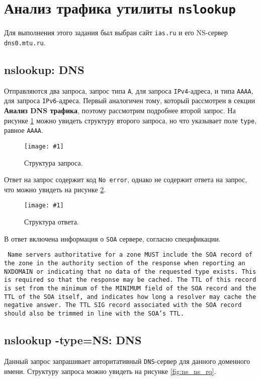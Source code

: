 \documentclass[12pt, a4paper]{article}
\newcommand{\figc}[4]{
  \begin{figure}[H]
  \begin{center}
    \texttt{[image: \#1]}
    \caption{#2}
    \label{fig:#3}
  \end{center}
  \end{figure}
}
\begin{document}
\section{Анализ трафика утилиты \texttt{nslookup}}

Для выполнения этого задания был выбран сайт \texttt{ias.ru} и его NS-сервер
\texttt{dns0.mtu.ru}.

\subsection{nslookup: DNS}

Отправляются два запроса, запрос типа \texttt{A}, для запроса \texttt{IPv4}-адреса,
и типа \texttt{AAAA}, для запроса \texttt{IPv6}-адреса. Первый аналогичен тому,
который рассмотрен в секции \textbf{Анализ DNS трафика}, поэтому рассмотрим
подробнее второй запрос. На рисунке \ref{fig:ns_rq} можно увидеть структуру
второго запроса, но что указывает поле \texttt{type}, равное \texttt{AAAA}.

\figc{nslookup_req}{Структура запроса.}{ns_rq}{2.5}

Ответ на запрос содержит код \texttt{No error}, однако не содержит ответа на
запрос, что можно увидеть на рисунке \ref{fig:ns_rs}.

\figc{nslookup_res}{Структура ответа.}{ns_rs}{2.5}

\newpage

В ответ включена информация о \texttt{SOA} сервере, согласно спецификации.

\noindent
\texttt{
   Name servers authoritative for a zone MUST include the SOA record of
   the zone in the authority section of the response when reporting an
   NXDOMAIN or indicating that no data of the requested type exists.
   This is required so that the response may be cached.  The TTL of this
   record is set from the minimum of the MINIMUM field of the SOA record
   and the TTL of the SOA itself, and indicates how long a resolver may
   cache the negative answer.  The TTL SIG record associated with the
   SOA record should also be trimmed in line with the SOA's TTL.
}

\subsection{nslookup -type=NS: DNS}

Данный запрос запрашивает авторитативный \texttt{DNS}-сервер для данного
доменного имени. Структуру запроса можно увидеть на рисунке \ref{fig:ns_ns_rq}.
\end{document}
